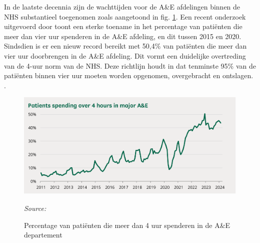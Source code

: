 






In de laatste decennia zijn de wachttijden voor de A\&E afdelingen binnen de NHS substantieel toegenomen zoals aangetoond in fig. \ref{fig:Figuur1}. Een recent onderzoek uitgevoerd door \autocite{Baker2024} toont een sterke toename in het percentage van patiënten die meer dan vier uur spenderen in de A\&E afdeling, en dit tussen 2015 en 2020. Sindsdien is er een nieuw record bereikt met 50,4\% van patiënten die meer dan vier uur doorbrengen in de A\&E afdeling. Dit vormt een duidelijke overtreding van de 4-uur norm van de NHS. Deze richtlijn houdt in dat tenminste 95\% van de patiënten binnen vier uur moeten worden opgenomen, overgebracht en ontslagen. \autocite{NationalStatisticsONS2024}.


\begin{figure}[h]
    \centering
    \includegraphics[width=1\linewidth]{img/Figuur-1.png}
    \caption{Percentage van patiënten die meer dan 4 uur spenderen in de A\&E departement}
    \label{fig:Figuur1}
    \textit{Source: \autocite{Baker2024}}
\end{figure}


